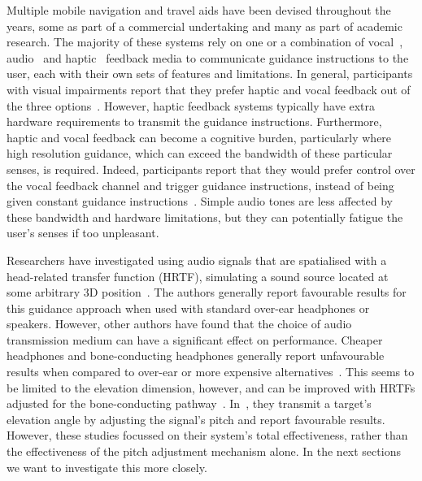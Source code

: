 \documentclass{llncs}
\begin{document}
Multiple mobile navigation and travel aids have been devised throughout the years, some as part of a commercial undertaking and many as part of academic research.
The majority of these systems rely on one or a combination of vocal~\cite{mocanu2016when,chessa2016integrated,kanwal2015navigation}, audio~\cite{schwarze2015intuitive,rodriguez2012obstacle,katz2010navig} and haptic~\cite{rivera-rubio2015assistive,lee2015rgb,xiao2015assistive} feedback media to communicate guidance instructions to the user, each with their own sets of features and limitations.
In general, participants with visual impairments report that they prefer haptic and vocal feedback out of the three options~\cite{arditi2013user}.
However, haptic feedback systems typically have extra hardware requirements to transmit the guidance instructions.
Furthermore, haptic and vocal feedback can become a cognitive burden, particularly where high resolution guidance, which can exceed the bandwidth of these particular senses, is required.
Indeed, participants report that they would prefer control over the vocal feedback channel and trigger guidance instructions, instead of being given constant guidance instructions~\cite{arditi2013user}.
Simple audio tones are less affected by these bandwidth and hardware limitations, but they can potentially fatigue the user's senses if too unpleasant.

Researchers have investigated using audio signals that are spatialised with a head-related transfer function (HRTF), simulating a sound source located at some arbitrary 3D position~\cite{geronazzo2016interactive,wilson2007swan,katz2010navig,blum2013spatialized}.
The authors generally report favourable results for this guidance approach when used with standard over-ear headphones or speakers. 
However, other authors have found that the choice of audio transmission medium can have a significant effect on performance.
Cheaper headphones and bone-conducting headphones generally report unfavourable results when compared to over-ear or more expensive alternatives~\cite{schonstein2008comparison,macdonald2006spatial,stanley2006lateralization}. 
This seems to be limited to the elevation dimension, however, and can be improved with HRTFs adjusted for the bone-conducting pathway~\cite{stanley2006lateralization}.
In~\cite{durette2008visuo}, they transmit a target's elevation angle by adjusting the signal's pitch and report favourable results. 
However, these studies focussed on their system's total effectiveness, rather than the effectiveness of the pitch adjustment mechanism alone. In the next sections we want to investigate this more closely. 
\end{document}
